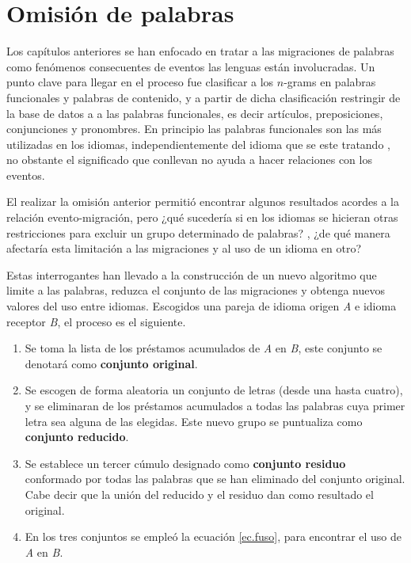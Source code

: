 \chapter{Omisión de palabras}


Los capítulos anteriores se han enfocado en tratar a las migraciones de palabras como fenómenos consecuentes de eventos las lenguas están involucradas. Un punto clave para llegar en el proceso fue clasificar a los $n$-grams en palabras funcionales y palabras de contenido, y a partir de dicha clasificación restringir de la base de datos a a las palabras funcionales, es decir artículos, preposiciones, conjunciones y pronombres. En principio  las palabras funcionales son las más utilizadas en los idiomas, independientemente del idioma que se este tratando \cite{iplosone}, no obstante  el significado que conllevan no ayuda a hacer relaciones con los eventos. 

El realizar la omisión anterior permitió encontrar algunos resultados acordes a la relación evento-migración, pero ¿qué sucedería si en los idiomas se hicieran otras restricciones para excluir un grupo determinado de palabras? , ¿de qué manera afectaría esta limitación a las migraciones y al uso de un idioma en otro?

Estas interrogantes han llevado a la construcción de un nuevo algoritmo que limite a las palabras, reduzca el conjunto de las migraciones y obtenga nuevos valores del uso entre idiomas. Escogidos una pareja de idioma origen \textit{A} e idioma receptor \textit{B}, el proceso es el siguiente. 


\begin{enumerate}
	
	\item Se toma la lista de los préstamos acumulados de \textit{A} en \textit{B},  este conjunto se denotará como \textbf{conjunto original}.
		
	\item Se escogen de forma aleatoria un conjunto de letras (desde una hasta cuatro), y se eliminaran de los préstamos acumulados a todas las palabras cuya primer letra sea alguna de las elegidas. Este nuevo grupo se puntualiza como \textbf{conjunto reducido}.
	
	\item Se establece un tercer cúmulo designado como \textbf{conjunto residuo} conformado por todas las palabras que se han eliminado del conjunto original.  Cabe decir que la unión del reducido y el residuo dan como resultado el original. 
	
	\item En los tres conjuntos se empleó la ecuación \ref{ec.fuso}, para encontrar el uso de \textit{A} en \textit{B}. 	
	 
\end{enumerate}

